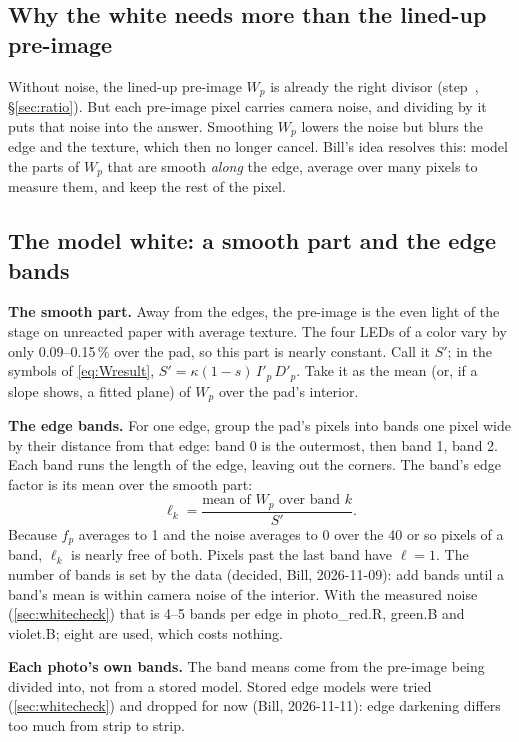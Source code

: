 \documentclass[11pt,letter]{article}
\makeatletter
\newcommand{\sno}[1]{step~\@nameuse{stepno@#1}}
\newcommand{\psref}[1]{\sno{#1}, \S\ref{#1}}  %
\makeatother
\begin{document}
\subsection{Why the white needs more than the lined-up pre-image}

Without noise, the lined-up pre-image $W_p$ is already the right divisor
(\psref{sec:ratio}).  But each pre-image pixel carries camera noise, and
dividing by it puts that noise into the answer.  Smoothing $W_p$ lowers the
noise but blurs the edge and the texture, which then no longer cancel.
Bill's idea resolves this: model the parts of $W_p$ that are smooth
\emph{along} the edge, average over many pixels to measure them, and keep
the rest of the pixel.

\subsection{The model white: a smooth part and the edge bands}

\textbf{The smooth part.}  Away from the edges, the pre-image is the even
light of the stage on unreacted paper with average texture.  The four LEDs
of a color vary by only 0.09--0.15\,\% over the pad, so this part is
nearly constant.  Call it $S'$; in the symbols of \eqref{eq:Wresult},
$S' = \kappa(1-s)\,I'_p\,D'_p$.  Take it as the mean (or, if a slope
shows, a fitted plane) of $W_p$ over the pad's interior.

\textbf{The edge bands.}  For one edge, group the pad's pixels into bands
one pixel wide by their distance from that edge: band 0 is the outermost,
then band 1, band 2.  Each band runs the length of the edge, leaving out the
corners.  The band's edge factor is its mean over the smooth part:
\begin{equation}
  \ell_k = \frac{\text{mean of } W_p \text{ over band } k}{S'} .
  \label{eq:band}
\end{equation}
Because $f_p$ averages to 1 and the noise averages to 0 over the 40 or so
pixels of a band, $\ell_k$ is nearly free of both.  Pixels past the last
band have $\ell = 1$.  The number of bands is set by the data (decided,
Bill, 2026-11-09): add bands
until a band's mean is within camera noise of the interior.  With the
measured noise (\cref{sec:whitecheck}) that is 4--5 bands per edge in
photo\_red.R, green.B and violet.B; eight are used, which costs nothing.

\textbf{Each photo's own bands.}  The band means come from the pre-image
being divided into, not from a stored model.  Stored edge models were
tried (\cref{sec:whitecheck}) and dropped for now (Bill, 2026-11-11):
edge darkening differs too much from strip to strip.
\end{document}
